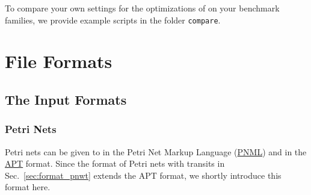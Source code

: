 \documentclass[12pt,twoside,a4paper,openright]{memoir}
\begin{document}
To compare your own settings for the optimizations of \tool{} on your benchmark families, we provide 
example scripts in the folder \texttt{compare}. 
\chapter{File Formats}
\section{The Input Formats}
\subsection{Petri Nets}
Petri nets can be given to \tool{} in the Petri Net Markup Language (\href{http://www.pnml.org/}{PNML})
and in the \href{https://github.com/CvO-Theory/apt}{APT} format.
Since the format of Petri nets with transits in Sec.~\ref{sec:format_pnwt} extends the APT format,
we shortly introduce this format here.
\end{document}
